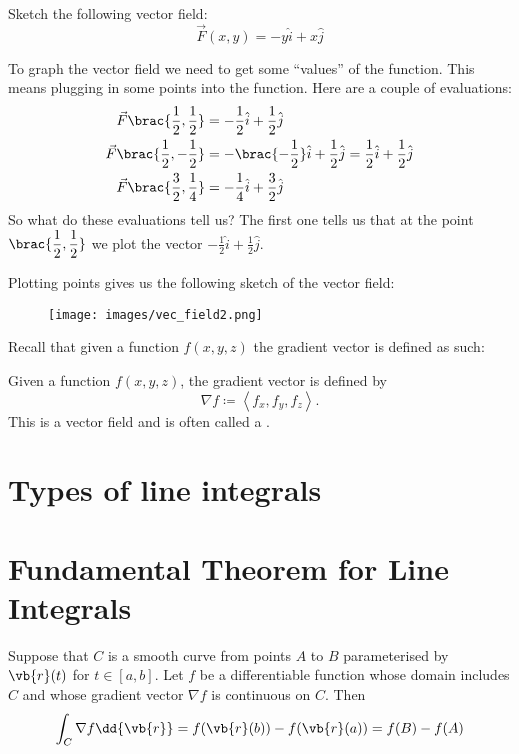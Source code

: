 \begin{exercise}
Sketch the following vector field:
\[ \vec{F}(x,y) = -y\hat{i} + x\hat{j} \]
\end{exercise}
\begin{solution}
To graph the vector field we need to get some ``values'' of the function. This means plugging in some points into the function. Here are a couple of evaluations:
\begin{align*}
\vec{F}\brac{{\frac{1}{2},\frac{1}{2}}} &=  -\frac{1}{2}\hat{i} + \frac{1}{2}\hat{j} \\
\vec{F}\brac{{\frac{1}{2},-\frac{1}{2}}} &=  -\brac{{-\frac{1}{2}}}\hat{i} + \frac{1}{2}\hat{j} = \frac{1}{2}\hat{i} + \frac{1}{2}\hat{j} \\
\vec{F}\brac{{\frac{3}{2},\frac{1}{4}}} &=  -\frac{1}{4}\hat{i} + \frac{3}{2}\hat{j}
\end{align*}
So what do these evaluations tell us? The first one tells us that at the point $\brac{\dfrac{1}{2},\dfrac{1}{2}}$ we plot the vector $-\frac{1}{2}\hat{i} + \frac{1}{2}\hat{j}$.

Plotting points gives us the following sketch of the vector field:

\begin{figure}[H]
    \centering
    \texttt{[image: images/vec\_field2.png]}
\end{figure}
\end{solution}

Recall that given a function $f(x,y,z)$ the gradient vector is defined as such:
\begin{definition}
Given a function $f(x,y,z)$, the gradient vector is defined by
\[ \nabla f\coloneqq\left\langle {{f_x},{f_y},{f_z}} \right\rangle. \]
This is a vector field and is often called a .
\end{definition}

\section{Types of line integrals}

\section{Fundamental Theorem for Line Integrals}
\begin{theorem}
Suppose that $C$ is a smooth curve from points $A$ to $B$ parameterised by $\vb{r}(t)$ for $t\in[a,b]$. Let $f$ be a differentiable function whose domain includes $C$ and whose gradient vector $\nabla f$ is continuous on $C$. Then
\begin{equation}
\int_C \nabla f \dd{\vb{r}} = f(\vb{r}(b)) - f(\vb{r}(a)) = f(B) - f(A)
\end{equation}
\end{theorem}


